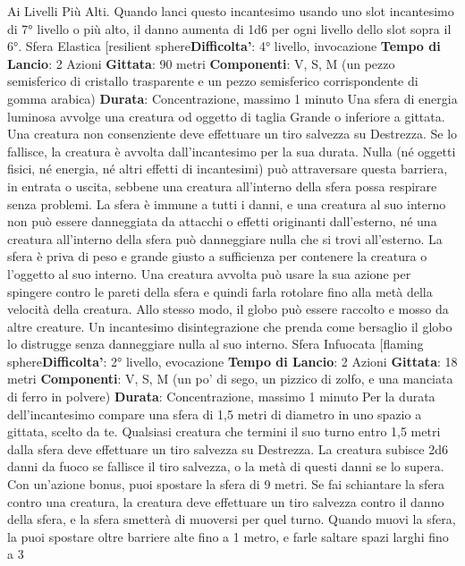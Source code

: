 \begin{multicols}{2}
Ai Livelli Più Alti. Quando lanci questo incantesimo
usando uno slot incantesimo di 7° livello o più alto, il
danno aumenta di 1d6 per ogni livello dello slot sopra il
6°.
Sfera Elastica
[resilient sphere\textbf{Difficolta'}:
4° livello, invocazione
\textbf{Tempo di Lancio}: 2 Azioni
\textbf{Gittata}: 90 metri
\textbf{Componenti}: V, S, M (un pezzo semisferico di cristallo
trasparente e un pezzo semisferico corrispondente di
gomma arabica)
\textbf{Durata}: Concentrazione, massimo 1 minuto
Una sfera di energia luminosa avvolge una creatura od
oggetto di taglia Grande o inferiore a gittata. Una
creatura non consenziente deve effettuare un tiro 
salvezza su Destrezza. Se lo fallisce, la creatura è
avvolta dall’incantesimo per la sua durata.
Nulla (né oggetti fisici, né energia, né altri effetti di
incantesimi) può attraversare questa barriera, in entrata
o uscita, sebbene una creatura all’interno della sfera
possa respirare senza problemi. La sfera è immune a
tutti i danni, e una creatura al suo interno non può
essere danneggiata da attacchi o effetti originanti
dall’esterno, né una creatura all’interno della sfera può
danneggiare nulla che si trovi all’esterno.
La sfera è priva di peso e grande giusto a sufficienza
per contenere la creatura o l’oggetto al suo interno. Una
creatura avvolta può usare la sua azione per spingere
contro le pareti della sfera e quindi farla rotolare fino
alla metà della velocità della creatura. Allo stesso
modo, il globo può essere raccolto e mosso da altre
creature.
Un incantesimo disintegrazione che prenda come
bersaglio il globo lo distrugge senza danneggiare nulla
al suo interno.
Sfera Infuocata
[flaming sphere\textbf{Difficolta'}:
2° livello, evocazione
\textbf{Tempo di Lancio}: 2 Azioni
\textbf{Gittata}: 18 metri
\textbf{Componenti}: V, S, M (un po’ di sego, un pizzico di
zolfo, e una manciata di ferro in polvere)
\textbf{Durata}: Concentrazione, massimo 1 minuto
Per la durata dell’incantesimo compare una sfera di 1,5
metri di diametro in uno spazio a gittata, scelto da te.
Qualsiasi creatura che termini il suo turno entro 1,5
metri dalla sfera deve effettuare un tiro salvezza su
Destrezza. La creatura subisce 2d6 danni da fuoco se
fallisce il tiro salvezza, o la metà di questi danni se lo
supera.
Con un’azione bonus, puoi spostare la sfera di 9 metri.
Se fai schiantare la sfera contro una creatura, la
creatura deve effettuare un tiro salvezza contro il danno
della sfera, e la sfera smetterà di muoversi per quel
turno.
Quando muovi la sfera, la puoi spostare oltre barriere
alte fino a 1 metro, e farle saltare spazi larghi fino a 3

\end{multicols}
